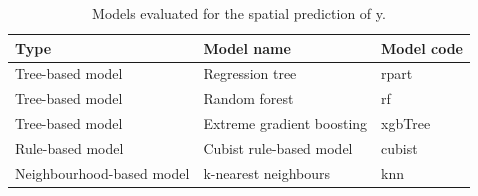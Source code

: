 \begin{table}[htbp]
\centering
\caption{Models evaluated for the spatial prediction of y.}
\label{tab:models}
\begin{tabular}{lll}
\hline
\textbf{Type} & \textbf{Model name} & \textbf{Model code} \\
\hline
Tree-based model & Regression tree & rpart \\
Tree-based model & Random forest & rf \\
Tree-based model & Extreme gradient boosting & xgbTree \\
Rule-based model & Cubist rule-based model & cubist \\
Neighbourhood-based model & k-nearest neighbours & knn \\
\hline
\end{tabular}
\end{table}
